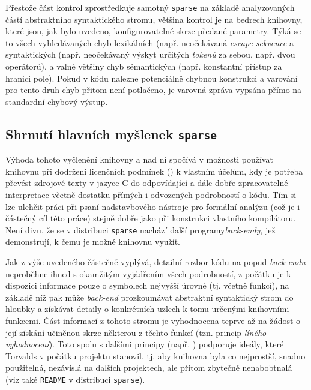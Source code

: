 Přestože část kontrol zprostředkuje samotný \texttt{sparse} na základě
analyzovaných částí abstraktního syntaktického stromu, většina kontrol je na bedrech
knihovny, které jsou, jak bylo uvedeno, konfigurovatelné skrze předané
parametry. Týká se to všech vyhledávaných chyb lexikálních (např. neočekávaná
\emph{escape-sekvence} a syntaktických (např. neočekávaný výskyt
určitých \emph{tokenů} za sebou, např. dvou operátorů), a valné většiny
chyb sémantických (např. konstantní přístup za hranici pole).
Pokud v kódu nalezne potenciálně chybnou konstrukci a varování pro tento
druh chyb přitom není potlačeno, je varovná zpráva vypsána přímo
na standardní chybový výstup.


\subsection{Shrnutí hlavních myšlenek \texttt{sparse}}

Výhoda tohoto vyčlenění knihovny a  nad ní spočívá v možnosti
používat  knihovnu při dodržení licenčních podmínek
()
k vlastním účelům, kdy je potřeba převést zdrojové
texty v jazyce C do odpovídající a dále dobře zpracovatelné
interpretace včetně dostatku přímých i odvozených
podrobností o kódu. Tím si lze ulehčit práci při psaní nadstavbového
nástroje pro formální analýzu (což je i částečný cíl této práce) stejně
dobře jako při konstrukci vlastního kompilátoru. Není divu, že se
v distribuci \texttt{sparse} nachází další programy\ndash\emph{back-endy},
jež demonstrují, k čemu je možné knihovnu využít.

Jak z výše uvedeného částečně vyplývá, detailní rozbor kódu
na popud \emph{back-endu} neproběhne ihned s okamžitým vyjádřením
všech podrobností, z počátku je k dispozici informace pouze o symbolech
nejvyšší úrovně (tj. včetně funkcí), na základě níž pak může
\emph{back-end} prozkoumávat abstraktní syntaktický strom do hloubky a získávat
detaily o konkrétních uzlech k tomu určenými knihovními funkcemi.
Část informací z tohoto stromu je vyhodnocena teprve až na žádost
o její získání učiněnou skrze některou z těchto funkcí
(tzn. princip \emph{líného vyhodnocení}). Toto spolu s dalšími principy
(např. ) podporuje
ideály, které Torvalds v počátku projektu stanovil, tj. aby
knihovna byla co nejprostší, snadno
použitelná, nezávislá na dalších projektech, ale přitom zbytečně
nenabobtnalá (viz také \texttt{README} v distribuci \texttt{sparse}).


